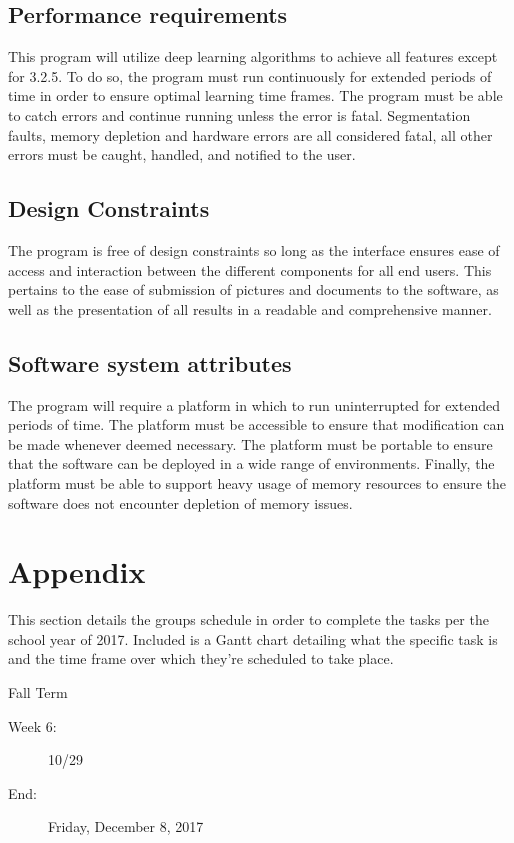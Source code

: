 \documentclass[onecolumn, draftclsnofoot,10pt, compsoc]{IEEEtran}
\begin{document}
\subsection{Performance requirements}
This program will utilize deep learning algorithms to achieve all features except for 3.2.5. To do so, the program must run continuously for extended periods of time in order to ensure optimal learning time frames. The program must be able to catch errors and continue running unless the error is fatal. Segmentation faults, memory depletion and hardware errors are all considered fatal, all other errors must be caught, handled, and notified to the user. 


\subsection{Design Constraints}
The program is free of design constraints so long as the interface ensures ease of access and interaction between the different components for all end users. This pertains to the ease of submission of pictures and documents to the software, as well as the presentation of all results in a readable and comprehensive manner. 


\subsection{Software system attributes}
The program will require a platform in which to run uninterrupted for extended periods of time. The platform must be accessible to ensure that modification can be made whenever deemed necessary. The platform must be portable to ensure that the software can be deployed in a wide range of environments.  Finally, the platform must be able to support heavy usage of memory resources to ensure the software does not encounter depletion of memory issues. 

\pagebreak

\section{Appendix}

This section details the groups schedule in order to complete the tasks per the school year of 2017. Included is a Gantt chart detailing what the specific task is and the time frame over which they're scheduled to take place.

Fall Term
\begin{description}
	\item[Week 6:]10/29
	\item[End:]   Friday, December 8, 2017
\end{description}
\end{document}
